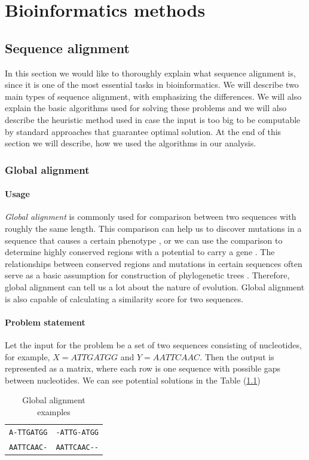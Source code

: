 \chapter{Bioinformatics methods}
\section{Sequence alignment}
In this section we would like to thoroughly explain what sequence alignment is, since it is one of the most essential tasks in bioinformatics.
We will describe two main types of sequence alignment, with emphasizing the differences.
We will also explain the basic algorithms used for solving these problems and we will also describe the heuristic method used in case the input is too big to be computable by standard approaches that guarantee optimal solution.
At the end of this section we will describe, how we used the algorithms in our analysis.

\subsection{Global alignment}
\subsubsection{Usage}
\emph{Global alignment} is commonly used for comparison between two sequences with roughly the same length.
This comparison can help us to discover mutations in a sequence that causes a certain phenotype \cite{}, or we can use the comparison to determine highly conserved regions with a potential to carry a gene \cite{}.
The relationships between conserved regions and mutations in certain sequences often serve as a basic assumption for construction of phylogenetic trees \cite{}.
Therefore, global alignment can tell us a lot about the nature of evolution.
Global alignment is also capable of calculating a similarity score for two sequences.

\subsubsection{Problem statement}
Let the input for the problem be a set of two sequences consisting of nucleotides, for example, $ X = ATTGATGG $ and $ Y = AATTCAAC $.
Then the output is represented as a matrix, where each row is one sequence with possible gaps between nucleotides.
We can see potential solutions in the Table (\ref{tab:potsol})

\begin{table}
  \centering
	\begin{tabular}{ l | r }
	\verb|A-TTGATGG| & \verb|-ATTG-ATGG| \\
	\verb|AATTCAAC-| & \verb|AATTCAAC--| \\
	\end{tabular}
  \caption{Global alignment examples}
  \label{tab:potsol}
\end{table}

